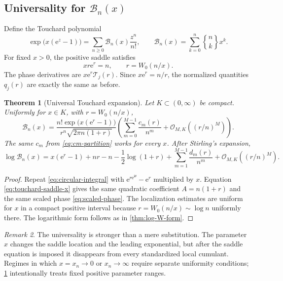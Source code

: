 \documentclass[11pt,a4paper]{article}
\newtheorem{theorem}{Theorem}[section]
\theoremstyle{definition}
\theoremstyle{remark}
\newtheorem{remark}[theorem]{Remark}
\newcommand{\Bell}{\mathcal B}
\newcommand{\Tch}{\mathscr T}
\newcommand{\ii}{\mathrm i}
\newcommand{\ee}{\mathrm e}
\newcommand{\BigO}{\mathcal O}
\newcommand{\Stwo}[2]{\genfrac\{\}{0pt}{}{#1}{#2}}
\begin{document}
\subsection{Universality for \texorpdfstring{\(\Bell_n(x)\)}{Bell polynomials}}

Define the Touchard polynomial
\begin{equation}\label{eq:touchard-egf-x}
 \exp\!\bigl(x(\ee^z-1)\bigr)
 =\sum_{n\ge0}\Bell_n(x)\frac{z^n}{n!},
 \qquad
 \Bell_n(x)=\sum_{k=0}^n\Stwo{n}{k}x^k.
\end{equation}
For fixed \(x>0\), the positive saddle satisfies
\begin{equation}\label{eq:touchard-saddle-x}
  xr\ee^r=n,
  \qquad r=W_0(n/x).
\end{equation}
The phase derivatives are \(x\ee^r\Tch_j(r)\).  Since
\(x\ee^r=n/r\), the normalized quantities \(q_j(r)\) are exactly the same as
before.

\begin{theorem}[Universal Touchard expansion]\label{thm:touchard-universal}
Let \(K\subset(0,\infty)\) be compact.  Uniformly for \(x\in K\), with
\(r=W_0(n/x)\),
\begin{equation}\label{eq:touchard-allorders}
 \Bell_n(x)=
 \frac{n!\exp\!\bigl(x(\ee^r-1)\bigr)}
      {r^n\sqrt{2\pi n(1+r)}}
 \left(
   \sum_{m=0}^{M-1}\frac{c_m(r)}{n^m}
   +\BigO_{M,K}\!\left((r/n)^M\right)
 \right).
\end{equation}
The same \(c_m\) from \cref{eq:cm-partition} works for every \(x\).
After Stirling's expansion,
\begin{equation}\label{eq:touchard-log}
 \log\Bell_n(x)
 =x(\ee^r-1)+nr-n-\frac12\log(1+r)
 +\sum_{m=1}^{M-1}\frac{d_m(r)}{n^m}
 +\BigO_{M,K}((r/n)^M).
\end{equation}
\end{theorem}

\begin{proof}
Repeat \cref{eq:circular-integral} with
\(\ee^{r\ee^{\ii\theta}}-\ee^r\) multiplied by \(x\).  Equation
\cref{eq:touchard-saddle-x} gives the same quadratic coefficient
\(A=n(1+r)\) and the same scaled phase \cref{eq:scaled-phase}.  The
localization estimates are uniform for \(x\) in a compact positive interval
because \(r=W_0(n/x)\sim\log n\) uniformly there.  The logarithmic form follows
as in \cref{thm:log-W-form}.
\end{proof}

\begin{remark}
The universality is stronger than a mere substitution.  The parameter \(x\)
changes the saddle location and the leading exponential, but after the saddle
equation is imposed it disappears from every standardized local cumulant.
Regimes in which \(x=x_n\to0\) or \(x_n\to\infty\) require separate uniformity
conditions; \cref{thm:touchard-universal} intentionally treats fixed positive
parameter ranges.
\end{remark}
\end{document}
